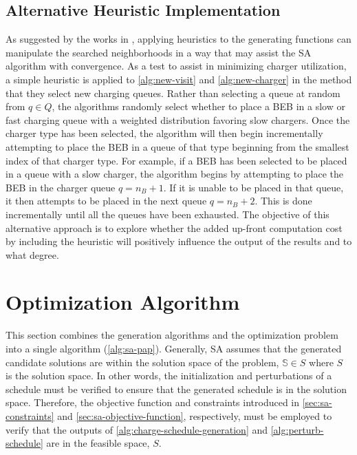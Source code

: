 \documentclass[ee,thesis]{usuthesis}
\newcommand{\Sol}{\mathbb{S}}               %
\begin{document}
\subsection{Alternative Heuristic Implementation}
\label{sec:heuristic-implementation}
As suggested by the works in \cite{Zhang_2010,Xinchao_2011}, applying heuristics to the generating functions can
manipulate the searched neighborhoods in a way that may assist the SA algorithm with convergence. As a test to assist in
minimizing charger utilization, a simple heuristic is applied to \ref{alg:new-visit} and \ref{alg:new-charger} in the
method that they select new charging queues. Rather than selecting a queue at random from \(q \in Q\), the algorithms
randomly select whether to place a BEB in a slow or fast charging queue with a weighted distribution favoring slow
chargers. Once the charger type has been selected, the algorithm will then begin incrementally attempting to place the
BEB in a queue of that type beginning from the smallest index of that charger type. For example, if a BEB has been
selected to be placed in a queue with a slow charger, the algorithm begins by attempting to place the BEB in the charger
queue \(q = n_B + 1\). If it is unable to be placed in that queue, it then attempts to be placed in the next queue \(q =
n_B + 2\). This is done incrementally until all the queues have been exhausted. The objective of this alternative
approach is to explore whether the added up-front computation cost by including the heuristic will positively influence
the output of the results and to what degree.

\section{Optimization Algorithm}
\label{sec:optimization-algorithm}
This section combines the generation algorithms and the optimization problem into a single algorithm (\ref{alg:sa-pap}).
Generally, SA assumes that the generated candidate solutions are within the solution space of the problem, \(\Sol \in S\)
where \(S\) is the solution space. In other words, the initialization and perturbations of a schedule must be verified to
ensure that the generated schedule is in the solution space. Therefore, the objective function and constraints
introduced in \ref{sec:sa-constraints} and \ref{sec:sa-objective-function}, respectively, must be employed to verify that the
outputs of \ref{alg:charge-schedule-generation} and \ref{alg:perturb-schedule} are in the feasible space, \(S\).
\end{document}
